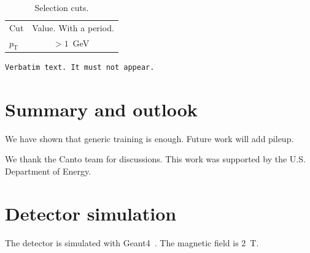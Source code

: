 \documentclass[aps,prd,twocolumn,superscriptaddress,nofootinbib]{revtex4-2}
\newcommand{\pT}{p_{\mathrm{T}}}
\begin{document}
\begin{table}[b]
  \caption{Selection cuts.\label{tab:cuts}}
  \begin{tabular}{lc}
    \hline
    Cut & Value. With a period. \\
    $\pT$ & $> 1$~GeV~\cite{Lee2019} \\
    \hline
  \end{tabular}
\end{table}

\begin{verbatim}
Verbatim text. It must not appear.
\end{verbatim}

\section{Summary and outlook}
\label{sec:concl}
We have shown that generic training is enough.
Future work will add pileup.

\begin{acknowledgments}
We thank the Canto team for discussions. This work was supported by the U.S. Department of Energy.
\end{acknowledgments}

\appendix
\section{Detector simulation}
\label{app:sim}
The detector is simulated with Geant4~\cite{Geant4}.
The magnetic field is 2~T.


\end{document}
